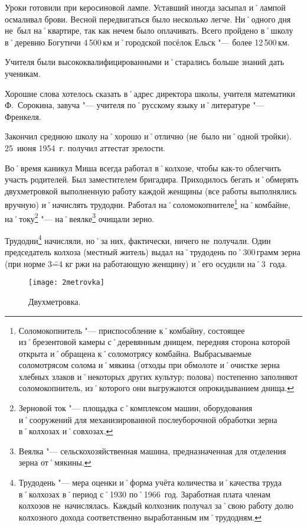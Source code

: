 Уроки готовили при керосиновой лампе. Уставший иногда засыпал и˚лампой осмаливал брови. Весной передвигаться было несколько легче. Ни˚одного дня не~был на˚квартире, так как нечем было оплачивать. Всего пройдено в˚школу в˚деревню Богутичи 4\,500\,км и˚городской посёлок Ельск "--- более 12\,500\,км. 

Учителя были высококвалифицированными и˚старались больше знаний дать ученикам.

Хорошие слова хотелось сказать в˚адрес директора школы, учителя математики Ф.~Сорокина, завуча "--- учителя по˚русскому языку и˚литературе "--- Френкеля. 

Закончил среднюю школу на˚хорошо и˚отлично (не~было ни˚одной тройки). 25~июня 1954~г. получил аттестат зрелости.

Во˚время каникул Миша всегда работал в˚колхозе, чтобы как-то облегчить участь родителей. Был заместителем бригадира. Приходилось бегать и˚обмерять двухметровкой выполненную работу каждой женщины (все работы выполнялись вручную) и˚начислять трудодни. Работал на˚соломокопнителе\footnote{Соломокопнитель "--- приспособление к˚комбайну, состоящее из˚брезентовой камеры с˚деревянным днищем, передняя сторона которой открыта и˚обращена к˚соломотрясу комбайна. Выбрасываемые соломотрясом солома и˚мякина (отходы при обмолоте и˚очистке зерна хлебных злаков и˚некоторых других культур; полова) постепенно заполняют соломокопнитель, из˚которого они выгружаются опрокидыванием днища.} на˚комбайне, на˚току\footnote{Зерновой ток "--- площадка с˚комплексом машин, оборудования и˚сооружений для механизированной послеуборочной обработки зерна в˚колхозах и˚совхозах.} "--- на˚веялке\footnote{Веялка "--- сельскохозяйственная машина, предназначенная для отделения зерна от˚мякины.} очищали зерно.

Трудодни\footnote{Трудодень "--- мера оценки и˚форма учёта количества и˚качества труда в˚колхозах в˚период с˚1930 по˚1966~год. Заработная плата членам колхозов не~начислялась. Каждый колхозник получал за˚свою работу долю колхозного дохода соответственно выработанным им˚трудодням.} начисляли, но˚за них, фактически, ничего не~получали. Один председатель колхоза (местный житель) выдал на˚трудодень по˚300\,грамм зерна (при норме 3\==4 кг ржи на работающую женщину) и˚его осудили на˚3~года.

\begin{wrapfigure}{O}{.25\textwidth}
\centering
\texttt{[image: 2metrovka]}
\caption[Двухметровка.]{Двухметровка\footnotemark.}
\label{fig:2metrovka}
\end{wrapfigure}

